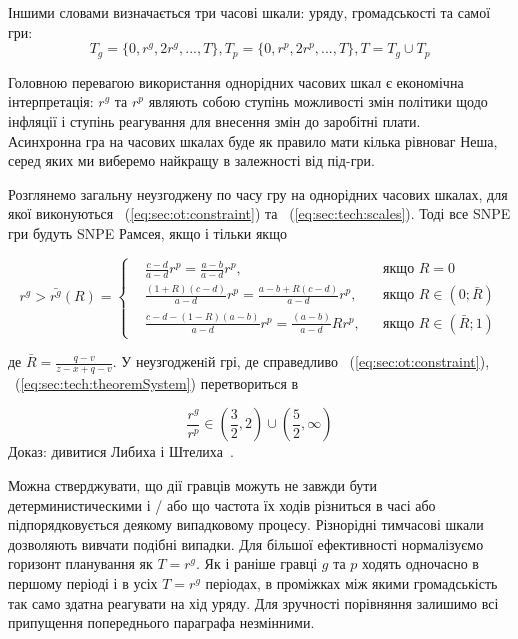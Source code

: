 Іншими словами визначається три часові шкали: уряду, громадськості та самої гри:
\begin{equation}
\label{eq:sec:tech:scales}
T_g = \{0,r^g,2r^g,...,T\}, T_p=\{0,r^p,2r^p,...,T\}, T=T_g\cup T_p 
\end{equation}

Головною перевагою використання однорідних часових шкал є економічна інтерпретація: $r^g$ та $r^p$ являють собою ступінь можливості змін політики щодо інфляції і ступінь реагування для внесення змін до заробітні плати.
\\

Асинхронна гра на часових шкалах буде як правило мати кілька рівноваг Неша, серед яких ми виберемо найкращу в залежності від під-гри.

\begin{theorem}
Розглянемо загальну неузгоджену по часу гру на однорідних часових шкалах, для якої виконуються ~(\ref{eq:sec:ot:constraint}) та ~(\ref{eq:sec:tech:scales}). Тоді все SNPE гри будуть SNPE Рамсея, якщо і тільки якщо
	
	\begin{equation}
	\label{eq:sec:tech:theoremSystem}
	r^g> \bar{r^g}(R) = \left\{ 
	\begin{aligned} 
	&\frac{c - d}{a-d}r^p= \frac{a-b}{a-d}r^p, &&\text{якщо } R=0
	\\
	&\frac{(1+R)(c-d)}{a-d}r^p= \frac{a-b + R(c-d)}{a-d}r^p, &&\text{якщо } 	R\in(0; \bar{R})
	\\
	&\frac{c-d-(1-R)(a-b)}{a-d}r^p= \frac{(a-b)}{a-d}Rr^p, &&\text{якщо } 	R\in(\bar{R};1)
	\end{aligned}
	\right.		
	\end{equation}
\end{theorem}
де $\bar{R}=\frac{q-v}{z-x+q-v}$. У неузгодженiй грі, де справедливо ~(\ref{eq:sec:ot:constraint}),  ~(\ref{eq:sec:tech:theoremSystem}) перетвориться в

\begin{equation}
\frac{r^g}{r^p} \in \left(\frac{3}{2}, 2\right)\cup \left(\frac{5}{2}, \infty\right)
\end{equation}
Доказ: дивитися Либиха і Штелиха~\cite{libichIncorpo}.


Можна стверджувати, що дії гравців можуть не завжди бути детерминистическими і / або що частота їх ходів різниться в часі або підпорядковується деякому випадковому процесу. Різнорідні тимчасові шкали дозволяють вивчати подібні випадки. Для більшої ефективності нормалізуємо горизонт планування як $T = r^g$. Як і раніше гравці $g$ та $p$ ходять одночасно в першому періоді і в усіх $T = r^g$ періодах, в проміжках між якими громадськість так само здатна реагувати на хід уряду. Для зручності порівняння залишимо всі припущення попереднього параграфа незмінними.

